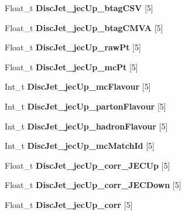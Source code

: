 \begin{DoxyCompactItemize}
Float\+\_\+t {\bfseries Disc\+Jet\+\_\+jec\+Up\+\_\+btag\+C\+SV} \mbox{[}5\mbox{]}
\item 
\hypertarget{classMiniTree_a41c280d7657a6f672bf9edf4babfb06a}{}\label{classMiniTree_a41c280d7657a6f672bf9edf4babfb06a} 
Float\+\_\+t {\bfseries Disc\+Jet\+\_\+jec\+Up\+\_\+btag\+C\+M\+VA} \mbox{[}5\mbox{]}
\item 
\hypertarget{classMiniTree_a565966a2bc2add7738348e0042b12384}{}\label{classMiniTree_a565966a2bc2add7738348e0042b12384} 
Float\+\_\+t {\bfseries Disc\+Jet\+\_\+jec\+Up\+\_\+raw\+Pt} \mbox{[}5\mbox{]}
\item 
\hypertarget{classMiniTree_a86c5c7837dbcc21bc590cd8173061ba7}{}\label{classMiniTree_a86c5c7837dbcc21bc590cd8173061ba7} 
Float\+\_\+t {\bfseries Disc\+Jet\+\_\+jec\+Up\+\_\+mc\+Pt} \mbox{[}5\mbox{]}
\item 
\hypertarget{classMiniTree_abf7fb7ae0e13c6a7fd3e3971c8252f9b}{}\label{classMiniTree_abf7fb7ae0e13c6a7fd3e3971c8252f9b} 
Int\+\_\+t {\bfseries Disc\+Jet\+\_\+jec\+Up\+\_\+mc\+Flavour} \mbox{[}5\mbox{]}
\item 
\hypertarget{classMiniTree_a5fcc2962f9890253d12da5efc2e7261f}{}\label{classMiniTree_a5fcc2962f9890253d12da5efc2e7261f} 
Int\+\_\+t {\bfseries Disc\+Jet\+\_\+jec\+Up\+\_\+parton\+Flavour} \mbox{[}5\mbox{]}
\item 
\hypertarget{classMiniTree_a9b031820bd1e514dadc9534e95ea693e}{}\label{classMiniTree_a9b031820bd1e514dadc9534e95ea693e} 
Int\+\_\+t {\bfseries Disc\+Jet\+\_\+jec\+Up\+\_\+hadron\+Flavour} \mbox{[}5\mbox{]}
\item 
\hypertarget{classMiniTree_a83efa5dae0996b47dc02e130316acceb}{}\label{classMiniTree_a83efa5dae0996b47dc02e130316acceb} 
Int\+\_\+t {\bfseries Disc\+Jet\+\_\+jec\+Up\+\_\+mc\+Match\+Id} \mbox{[}5\mbox{]}
\item 
\hypertarget{classMiniTree_a2c58c56baf9d770abed492e164c2bed3}{}\label{classMiniTree_a2c58c56baf9d770abed492e164c2bed3} 
Float\+\_\+t {\bfseries Disc\+Jet\+\_\+jec\+Up\+\_\+corr\+\_\+\+J\+E\+C\+Up} \mbox{[}5\mbox{]}
\item 
\hypertarget{classMiniTree_af3e50c84c795a56d991b8db83bc48fe1}{}\label{classMiniTree_af3e50c84c795a56d991b8db83bc48fe1} 
Float\+\_\+t {\bfseries Disc\+Jet\+\_\+jec\+Up\+\_\+corr\+\_\+\+J\+E\+C\+Down} \mbox{[}5\mbox{]}
\item 
\hypertarget{classMiniTree_ab8c06f39f6bc5ad248bf8322d002124b}{}\label{classMiniTree_ab8c06f39f6bc5ad248bf8322d002124b} 
Float\+\_\+t {\bfseries Disc\+Jet\+\_\+jec\+Up\+\_\+corr} \mbox{[}5\mbox{]}
\item 

\end{DoxyCompactItemize}
